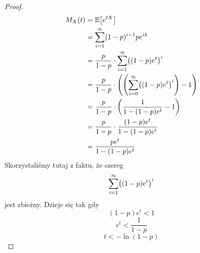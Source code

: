 \begin{proof}
    \begin{align*}
        M_X(t) 
            &= \expected{e^{tX}} \\
            &= \sum_{i=1}^\infty (1-p)^{i-1}pe^{ik} \\
            &= \frac{p}{1 - p} \cdot \sum_{i=1}^\infty \pars{(1-p)e^t}^i \\
            &= \frac{p}{1-p} \cdot \pars{\pars{\sum_{i=0}^\infty \pars{(1-p)e^t}^i} - 1} \\
            &= \frac{p}{1-p} \cdot \pars{\frac{1}{1 - (1-p)e^t} - 1} \\
            &= \frac{p}{1-p} \cdot \frac{(1-p)e^t}{1 - (1-p)e^t} \\
            &= \frac{pe^t}{1 - (1-p)e^t}
    \end{align*}
    Skorzystaliśmy tutaj z faktu, że szereg \[ \sum_{i=1}^\infty \pars{(1-p)e^t}^i \]
    jest zbieżny. Dzieje się tak gdy 
    \[
        (1-p)e^t < 1
    \]
    \[
        e^t < \frac{1}{1-p}
    \]
    \[
        t < -\ln (1-p)
    \]
\end{proof}